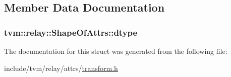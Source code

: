 \subsection{Member Data Documentation}
\subsubsection[{\texorpdfstring{dtype}{dtype}}]{ tvm\+::relay\+::\+Shape\+Of\+Attrs\+::dtype}\hypertarget{structtvm_1_1relay_1_1ShapeOfAttrs_a4971bcf217d49330d12c48997274f264}{}\label{structtvm_1_1relay_1_1ShapeOfAttrs_a4971bcf217d49330d12c48997274f264}


The documentation for this struct was generated from the following file\+:\begin{DoxyCompactItemize}
\item 
include/tvm/relay/attrs/\hyperlink{include_2tvm_2relay_2attrs_2transform_8h}{transform.\+h}\end{DoxyCompactItemize}
